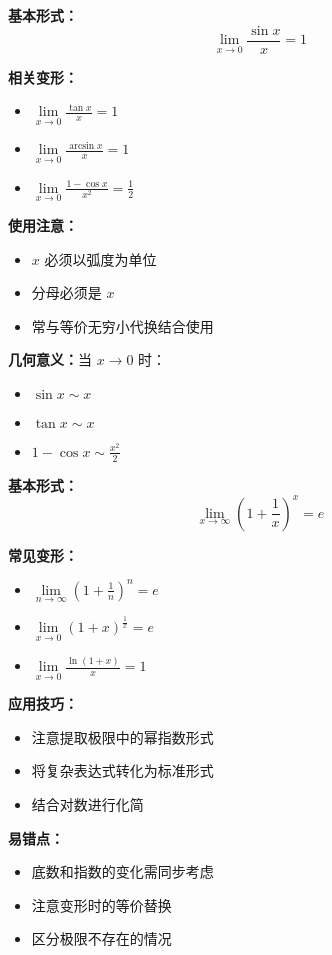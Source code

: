 \documentclass{ctexart}
\begin{document}
\begin{example}[第一重要极限及其应用]
\textbf{基本形式：}
\[ \lim_{x \to 0} \frac{\sin x}{x} = 1 \]

\textbf{相关变形：}
\begin{itemize}
    \item $\lim\limits_{x \to 0} \frac{\tan x}{x} = 1$
    \item $\lim\limits_{x \to 0} \frac{\arcsin x}{x} = 1$
    \item $\lim\limits_{x \to 0} \frac{1-\cos x}{x^2} = \frac{1}{2}$
\end{itemize}

\textbf{使用注意：}
\begin{itemize}
    \item $x$ 必须以弧度为单位
    \item 分母必须是 $x$
    \item 常与等价无穷小代换结合使用
\end{itemize}

\textbf{几何意义：}当 $x \to 0$ 时：
\begin{itemize}
    \item $\sin x \sim x$
    \item $\tan x \sim x$
    \item $1-\cos x \sim \frac{x^2}{2}$
\end{itemize}
\end{example}

\begin{example}[第二重要极限及其应用]
\textbf{基本形式：}
\[ \lim_{x \to \infty} (1+\frac{1}{x})^x = e \]

\textbf{常见变形：}
\begin{itemize}
    \item $\lim\limits_{n \to \infty} (1+\frac{1}{n})^n = e$
    \item $\lim\limits_{x \to 0} (1+x)^{\frac{1}{x}} = e$
    \item $\lim\limits_{x \to 0} \frac{\ln(1+x)}{x} = 1$
\end{itemize}

\textbf{应用技巧：}
\begin{itemize}
    \item 注意提取极限中的幂指数形式
    \item 将复杂表达式转化为标准形式
    \item 结合对数进行化简
\end{itemize}

\textbf{易错点：}
\begin{itemize}
    \item 底数和指数的变化需同步考虑
    \item 注意变形时的等价替换
    \item 区分极限不存在的情况
\end{itemize}
\end{example}
\end{document}
